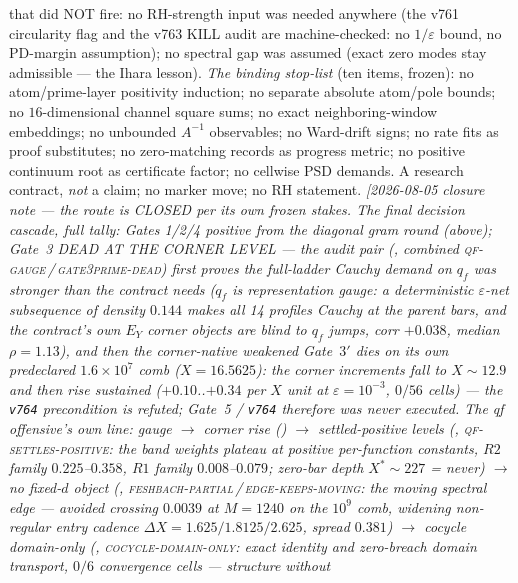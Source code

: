 {{that did NOT fire:} no RH-strength input was needed anywhere (the
v761 circularity flag and the v763 KILL audit are machine-checked:
no $1/\varepsilon$ bound, no PD-margin assumption); no spectral gap
was assumed (exact zero modes stay admissible --- the Ihara
lesson).  \emph{The binding stop-list} (ten items, frozen): no
atom/prime-layer positivity induction; no separate absolute
atom/pole bounds; no $16$-dimensional channel square sums; no exact
neighboring-window embeddings; no unbounded $A^{-1}$ observables;
no Ward-drift signs; no rate fits as proof substitutes; no
zero-matching records as progress metric; no positive continuum
root as certificate factor; no cellwise PSD demands.  A research
contract, \emph{not} a claim; no marker move; no RH
statement.
\emph{[2026-08-05 closure note --- the route is CLOSED per its own
frozen stakes.  The final decision cascade, full tally: Gates
1/2/4 positive from the diagonal gram round (above); Gate~3 DEAD
AT THE CORNER LEVEL --- the audit pair
(, combined
\textsc{qf-gauge}\,/\,\textsc{gate3prime-dead}) first proves the
full-ladder Cauchy demand on $q_f$ was \emph{stronger} than the
contract needs ($q_f$ is representation gauge: a deterministic
$\varepsilon$-net subsequence of density $0.144$ makes all 14
profiles Cauchy at the parent bars, and the contract's own $E_Y$
corner objects are blind to $q_f$ jumps, corr $+0.038$, median
$\rho=1.13$), and then the corner-native weakened Gate~$3'$ dies
on its own predeclared $1.6\times10^{7}$ comb ($X=16.5625$): the
corner increments fall to $X\sim12.9$ and then rise sustained
($+0.10$..$+0.34$ per $X$ unit at $\varepsilon=10^{-3}$, $0/56$
cells) --- the \texttt{v764} precondition is refuted; Gate~5 /
\texttt{v764} therefore was \emph{never executed}.  The qf
offensive's own line: gauge $\to$ corner rise
() $\to$ settled-positive
levels (,
\textsc{qf-settles-positive}: the band weights plateau at
positive per-function constants, $R2$ family $0.225$--$0.358$,
$R1$ family $0.008$--$0.079$; zero-bar depth $X^{*}\sim227$ =
never) $\to$ no fixed-$d$ object
(,
\textsc{feshbach-partial}\,/\,\textsc{edge-keeps-moving}: the
moving spectral edge --- avoided crossing $0.0039$ at $M=1240$ on
the $10^{9}$ comb, widening non-regular entry cadence $\Delta X =
1.625/1.8125/2.625$, spread $0.381$) $\to$ cocycle domain-only
(,
\textsc{cocycle-domain-only}: exact identity and zero-breach
domain transport, $0/6$ convergence cells --- structure without
}}
